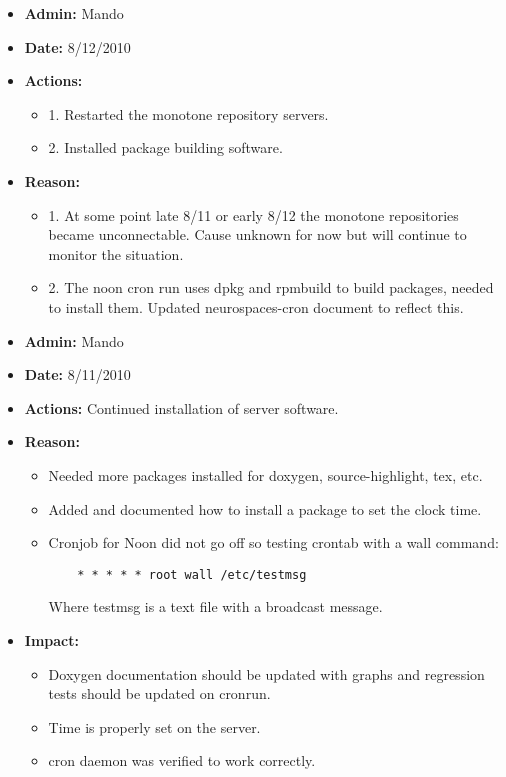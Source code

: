 \documentclass[12pt]{article}
\begin{document}
\begin{itemize}
\item[] {\bf Admin:} Mando
\item[] {\bf Date:} 8/12/2010 
\item[] {\bf Actions:} 
\begin{itemize}
	\item[] 1. Restarted the monotone repository servers.
	\item[] 2. Installed package building software.
\end{itemize}
\item[] {\bf Reason:} 
\begin{itemize}
	\item[] 1. At some point late 8/11 or early 8/12 the monotone repositories became unconnectable. Cause unknown for now but will continue to monitor the situation.
	\item[] 2. The noon cron run uses dpkg and rpmbuild to build packages, needed to install them. Updated neurospaces-cron document to reflect this.
\end{itemize}
\end{itemize}

\begin{itemize}
\item[] {\bf Admin:} Mando
\item[] {\bf Date:} 8/11/2010 
\item[] {\bf Actions:} Continued installation of server software.
\item[] {\bf Reason:} 
\begin{itemize}
\item[] Needed more packages installed for doxygen, source-highlight, tex, etc. 
\item[] Added and documented how to install a package to set the clock time.
\item[] Cronjob for Noon did not go off so testing crontab with a wall command:
\begin{verbatim}
	* * * * * root wall /etc/testmsg
\end{verbatim}
Where testmsg is a text file with a broadcast message.
\end{itemize}
	
\item[] {\bf Impact:} 
\begin{itemize}
\item[] Doxygen documentation should be updated with graphs and regression tests should be updated on cronrun. 
\item[] Time is properly set on the server.
\item[] cron daemon was verified to work correctly.
\end{itemize}
\end{itemize}
\end{document}
